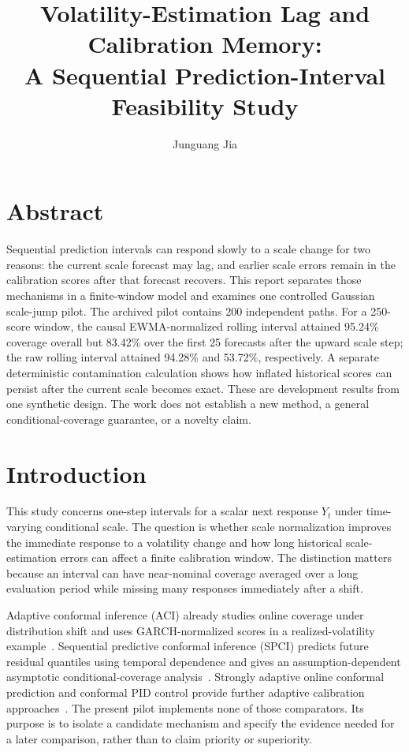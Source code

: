 \documentclass[11pt]{article}
\title{Volatility-Estimation Lag and Calibration Memory:\\
A Sequential Prediction-Interval Feasibility Study}
\author{Junguang Jia}
\date{}
\begin{document}
\maketitle

\section*{Abstract}
Sequential prediction intervals can respond slowly to a scale change for two
reasons: the current scale forecast may lag, and earlier scale errors remain in
the calibration scores after that forecast recovers. This report separates
those mechanisms in a finite-window model and examines one controlled Gaussian
scale-jump pilot. The archived pilot contains 200 independent paths. For a
250-score window, the causal EWMA-normalized rolling interval attained 95.24\%
coverage overall but 83.42\% over the first 25 forecasts after the upward
scale step; the raw rolling interval attained 94.28\% and 53.72\%,
respectively. A separate deterministic contamination calculation shows how
inflated historical scores can persist after the current scale becomes exact.
These are development results from one synthetic design. The work does not
establish a new method, a general conditional-coverage guarantee, or a
novelty claim.

\section{Introduction}
This study concerns one-step intervals for a scalar next response $Y_t$ under
time-varying conditional scale. The question is whether scale normalization
improves the immediate response to a volatility change and how long historical
scale-estimation errors can affect a finite calibration window. The distinction
matters because an interval can have near-nominal coverage averaged over a long
evaluation period while missing many responses immediately after a shift.

Adaptive conformal inference (ACI) already studies online coverage under
distribution shift and uses GARCH-normalized scores in a realized-volatility
example~\cite{gibbs2021}. Sequential predictive conformal inference (SPCI)
predicts future residual quantiles using temporal dependence and gives an
assumption-dependent asymptotic conditional-coverage analysis~\cite{xu2023}.
Strongly adaptive online conformal prediction and conformal PID control provide
further adaptive calibration approaches~\cite{bhatnagar2023,angelopoulos2023}.
The present pilot implements none of those comparators. Its purpose is to
isolate a candidate mechanism and specify the evidence needed for a later
comparison, rather than to claim priority or superiority.
\end{document}
